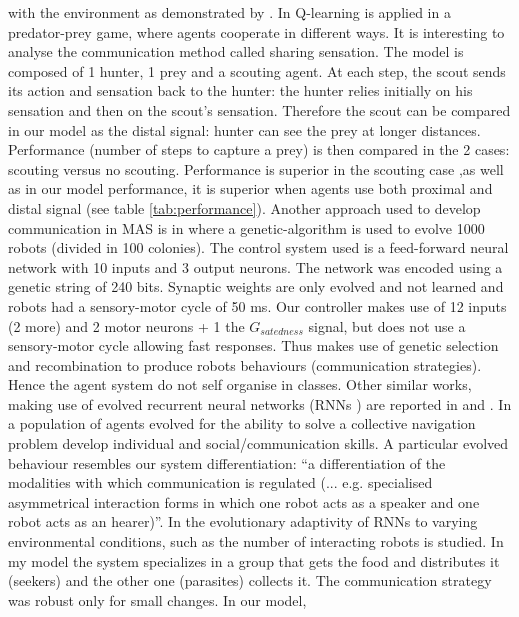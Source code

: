 with the environment as demonstrated by \citet{McFarland93}.
In \citet{tan97multiagent} Q-learning is applied in a predator-prey game,
where agents cooperate in different ways. It is interesting to analyse the
communication method called sharing sensation. The model is composed of 1 hunter,
1 prey and a scouting agent. At each step, the scout sends its action and sensation
back to the hunter: the hunter relies initially on his sensation and
then on the scout's sensation. Therefore the scout can be compared in our model
 as the distal signal: hunter can see the prey at longer distances.
Performance (number of steps to capture a prey) is then compared in the 2 cases:
scouting versus no scouting. Performance is superior in the scouting case
,as well as in our model performance, it is superior when agents use both
proximal and distal signal (see table \ref{tab:performance}).
Another approach used to develop communication in MAS is in \citet{Floreano-MAS}
where a genetic-algorithm is used to evolve 1000 robots (divided in 100 colonies).
The control system used is a feed-forward neural network with 10 inputs and 3 output neurons.
The network was encoded using a genetic string of 240 bits. Synaptic weights are only
evolved and not learned and robots had a sensory-motor cycle of 50 ms.
Our controller makes use of 12 inputs (2 more) and 2 motor neurons + 1 the
$G_{satedness}$ signal, but does not use a sensory-motor cycle allowing fast responses.
Thus \citet{Floreano-MAS} makes use of genetic selection and recombination to produce
robots behaviours (communication strategies). Hence the agent system do not self organise
in classes.
Other similar works, making use of evolved recurrent neural networks
(RNNs )
are reported in \citet{EmergenceCommMas} and \citet{OriginsComm}. In \citet{OriginsComm}
a population of agents evolved for the ability to solve a collective navigation problem
develop individual and social/communication skills. A particular evolved behaviour
resembles our system differentiation: ``a differentiation of the modalities with
which communication is regulated (... e.g. specialised asymmetrical interaction
forms in which one robot acts as a speaker and one robot acts as an hearer)''.
In \citet{EmergenceCommMas} the evolutionary adaptivity of RNNs to
varying environmental conditions, such as the number of interacting robots is studied.
In my model the system specializes in a group that gets the food and distributes it (seekers) and
the other one (parasites) collects it.
The communication strategy was robust only for small changes. In our model,
